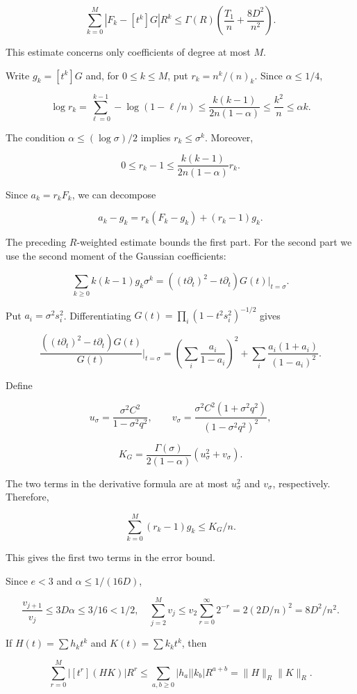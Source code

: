 \documentclass[11pt,a4paper]{article}
\begin{document}
\[
\sum_{k=0}^{M}|F_k-[t^k]G|R^k
\le\Gamma(R)\left(\frac{T_1}n+\frac{8D^2}{n^2}\right).
\]

This estimate concerns only coefficients of degree at most \(M\).

Write \(g_k=[t^k]G\) and, for \(0\le k\le M\), put \(r_k=n^k/(n)_k\). Since \(\alpha\le1/4\),

\[
\log r_k
=\sum_{\ell=0}^{k-1}-\log(1-\ell/n)
\le\frac{k(k-1)}{2n(1-\alpha)}
\le\frac{k^2}n
\le\alpha k.
\]

The condition \(\alpha\le(\log\sigma)/2\) implies \(r_k\le\sigma^k\). Moreover,

\[
0\le r_k-1
\le\frac{k(k-1)}{2n(1-\alpha)}r_k.
\]

Since \(a_k=r_kF_k\), we can decompose

\[
a_k-g_k=r_k(F_k-g_k)+(r_k-1)g_k.
\]

The preceding \(R\)-weighted estimate bounds the first part. For the second part we use the second moment of the Gaussian coefficients:

\[
\sum_{k\ge0}k(k-1)g_k\sigma^k
=\left((t\partial_t)^2-t\partial_t\right)G(t)\big|_{t=\sigma}.
\]

Put \(a_i=\sigma^2s_i^2\). Differentiating \(G(t)=\prod_i(1-t^2s_i^2)^{-1/2}\) gives

\[
\frac{\left((t\partial_t)^2-t\partial_t\right)G(t)}{G(t)}
\bigg|_{t=\sigma}
=\left(\sum_i\frac{a_i}{1-a_i}\right)^2
+\sum_i\frac{a_i(1+a_i)}{(1-a_i)^2}.
\]

Define

\[
u_\sigma=\frac{\sigma^2C^2}{1-\sigma^2q^2},
\qquad
v_\sigma=\frac{\sigma^2C^2(1+\sigma^2q^2)}
{(1-\sigma^2q^2)^2},
\]

\[
K_G=\frac{\Gamma(\sigma)}{2(1-\alpha)}
\left(u_\sigma^2+v_\sigma\right).
\]

The two terms in the derivative formula are at most \(u_\sigma^2\) and \(v_\sigma\), respectively. Therefore,

\[
\sum_{k=0}^{M}(r_k-1)g_k\le K_G/n.
\]

This gives the first two terms in the error bound.

Since \(e<3\) and \(\alpha\le1/(16D)\),

\[
\frac{v_{j+1}}{v_j}\le3D\alpha\le3/16<1/2,
\quad
\sum_{j=2}^Mv_j\le v_2\sum_{r=0}^{\infty}2^{-r}
=2(2D/n)^2=8D^2/n^2.
\]

If \(H(t)=\sum h_kt^k\) and \(K(t)=\sum k_kt^k\), then

\[
\sum_{r=0}^M|[t^r](HK)|R^r
\le\sum_{a,b\ge0}|h_a||k_b|R^{a+b}
=\|H\|_R\|K\|_R.
\]
\end{document}
